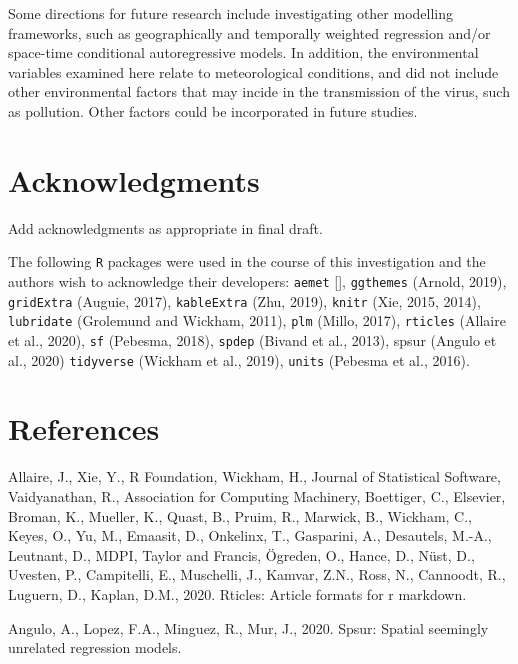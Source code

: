 \documentclass[]{elsarticle} %
\begin{document}
Some directions for future research include investigating other
modelling frameworks, such as geographically and temporally weighted
regression and/or space-time conditional autoregressive models. In
addition, the environmental variables examined here relate to
meteorological conditions, and did not include other environmental
factors that may incide in the transmission of the virus, such as
pollution. Other factors could be incorporated in future studies.

\hypertarget{acknowledgments}{%
\section*{Acknowledgments}\label{acknowledgments}}

Add acknowledgments as appropriate in final draft.

The following \texttt{R} packages were used in the course of this
investigation and the authors wish to acknowledge their developers:
\texttt{aemet} {[}{]}, \texttt{ggthemes} (Arnold, 2019),
\texttt{gridExtra} (Auguie, 2017), \texttt{kableExtra} (Zhu, 2019),
\texttt{knitr} (Xie, 2015, 2014), \texttt{lubridate} (Grolemund and
Wickham, 2011), \texttt{plm} (Millo, 2017), \texttt{rticles} (Allaire et
al., 2020), \texttt{sf} (Pebesma, 2018), \texttt{spdep} (Bivand et al.,
2013), spsur (Angulo et al., 2020) \texttt{tidyverse} (Wickham et al.,
2019), \texttt{units} (Pebesma et al., 2016).

\hypertarget{references}{%
\section*{References}\label{references}}

\hypertarget{refs}{}
\leavevmode\hypertarget{ref-Allaire2020}{}%
Allaire, J., Xie, Y., R Foundation, Wickham, H., Journal of Statistical
Software, Vaidyanathan, R., Association for Computing Machinery,
Boettiger, C., Elsevier, Broman, K., Mueller, K., Quast, B., Pruim, R.,
Marwick, B., Wickham, C., Keyes, O., Yu, M., Emaasit, D., Onkelinx, T.,
Gasparini, A., Desautels, M.-A., Leutnant, D., MDPI, Taylor and Francis,
Ögreden, O., Hance, D., Nüst, D., Uvesten, P., Campitelli, E.,
Muschelli, J., Kamvar, Z.N., Ross, N., Cannoodt, R., Luguern, D.,
Kaplan, D.M., 2020. Rticles: Article formats for r markdown.

\leavevmode\hypertarget{ref-Angulo2020spsur}{}%
Angulo, A., Lopez, F.A., Minguez, R., Mur, J., 2020. Spsur: Spatial
seemingly unrelated regression models.
\end{document}
